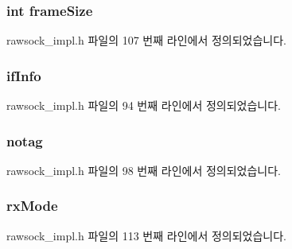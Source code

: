 \subsubsection[{\texorpdfstring{frame\+Size}{frameSize}}]{\setlength{\rightskip}{0pt plus 5cm}int frame\+Size}\hypertarget{structbase__rawsock_aa3dad37bb3b3c95138a96b2668936923}{}\label{structbase__rawsock_aa3dad37bb3b3c95138a96b2668936923}


rawsock\+\_\+impl.\+h 파일의 107 번째 라인에서 정의되었습니다.

\subsubsection[{\texorpdfstring{if\+Info}{ifInfo}}]{ if\+Info}\hypertarget{structbase__rawsock_a854c8024bff83a6b215a4897ac1d8944}{}\label{structbase__rawsock_a854c8024bff83a6b215a4897ac1d8944}


rawsock\+\_\+impl.\+h 파일의 94 번째 라인에서 정의되었습니다.

\subsubsection[{\texorpdfstring{notag}{notag}}]{ notag}\hypertarget{structbase__rawsock_a53fa4eb792bc48ddf828aa079f555c15}{}\label{structbase__rawsock_a53fa4eb792bc48ddf828aa079f555c15}


rawsock\+\_\+impl.\+h 파일의 98 번째 라인에서 정의되었습니다.

\subsubsection[{\texorpdfstring{rx\+Mode}{rxMode}}]{ rx\+Mode}\hypertarget{structbase__rawsock_aad4d1429d48996f23f9dd4b0f1940850}{}\label{structbase__rawsock_aad4d1429d48996f23f9dd4b0f1940850}


rawsock\+\_\+impl.\+h 파일의 113 번째 라인에서 정의되었습니다.

